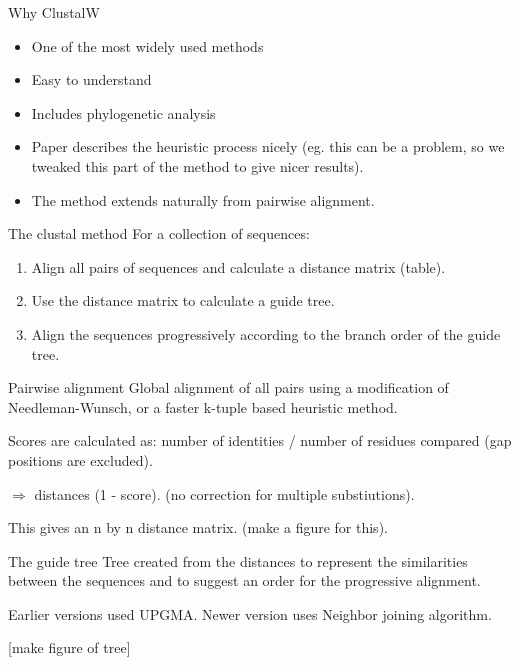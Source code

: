 \documentclass[pdf]{beamer}
\begin{document}
\begin{frame}{Why ClustalW}
  \begin{itemize}
    \item One of the most widely used methods
    \item Easy to understand
    \item Includes phylogenetic analysis
    \item Paper describes the heuristic process nicely (eg. this can be a 
      problem, so we tweaked this part of the method to give nicer results).
    \item The method extends naturally from pairwise alignment.
  \end{itemize}

\end{frame}

\begin{frame}{The clustal method}
  For a collection of sequences:
  \begin{enumerate}
  \item Align all pairs of sequences and calculate a distance matrix (table).
  \item Use the distance matrix to calculate a guide tree.
  \item Align the sequences progressively according to the branch order
    of the guide tree.
  \end{enumerate}
\end{frame}

\begin{frame}{Pairwise alignment}
  Global alignment of all pairs using a modification of Needleman-Wunsch,
  or a faster k-tuple based heuristic method.

  Scores are calculated as: number of identities / number of residues compared
  (gap positions are excluded).

  $\Rightarrow$ distances (1 - score). (no correction for multiple substiutions).
  
  This gives an n by n distance matrix. (make a figure for this).
\end{frame}

\begin{frame}{The guide tree}
  Tree created from the distances to represent the similarities between the
  sequences and to suggest an order for the progressive alignment. 

  Earlier versions used UPGMA. Newer version uses Neighbor joining algorithm.

  [make figure of tree]
\end{frame}
\end{document}
